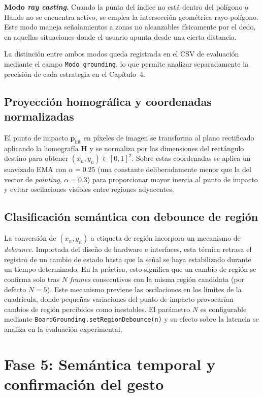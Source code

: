 \documentclass[12pt]{report} %
\begin{document}
\textbf{Modo \textit{ray casting}.} Cuando la punta del índice no está dentro del polígono o Hands no se encuentra activo, se emplea la intersección geométrica rayo-polígono. Este modo maneja señalamientos a zonas no alcanzables físicamente por el dedo, en aquellas situaciones donde el usuario apunta desde una cierta distancia.

La distinción entre ambos modos queda registrada en el CSV de evaluación mediante el campo \texttt{Modo\_grounding}, lo que permite analizar separadamente la precisión de cada estrategia en el Capítulo~4.

\subsection{Proyección homográfica y coordenadas normalizadas}

El punto de impacto $\mathbf{p}_{\text{hit}}$ en píxeles de imagen se transforma al plano rectificado aplicando la homografía $\mathbf{H}$ y se normaliza por las dimensiones del rectángulo destino para obtener $(x_n, y_n) \in [0,1]^2$. Sobre estas coordenadas se aplica un suavizado EMA con $\alpha = 0.25$ (una constante deliberadamente menor que la del vector de \textit{pointing}, $\alpha = 0.3$) para proporcionar mayor inercia al punto de impacto y evitar oscilaciones visibles entre regiones adyacentes.

\subsection{Clasificación semántica con debounce de región}

La conversión de $(x_n, y_n)$ a etiqueta de región incorpora un mecanismo de \textit{debounce}. Importada del diseño de hardware e interfaces, esta técnica retrasa el registro de un cambio de estado hasta que la señal se haya estabilizado durante un tiempo determinado. En la práctica, esto significa que un cambio de región se confirma solo tras $N$ \textit{frames} consecutivos con la misma región candidata (por defecto $N=5$). Este mecanismo previene las oscilaciones en los límites de la cuadrícula, donde pequeñas variaciones del punto de impacto provocarían cambios de región percibidos como inestables. El parámetro $N$ es configurable mediante \texttt{BoardGrounding.setRegionDebounce(n)} y su efecto sobre la latencia se analiza en la evaluación experimental.

\section{Fase 5: Semántica temporal y confirmación del gesto}
\end{document}

